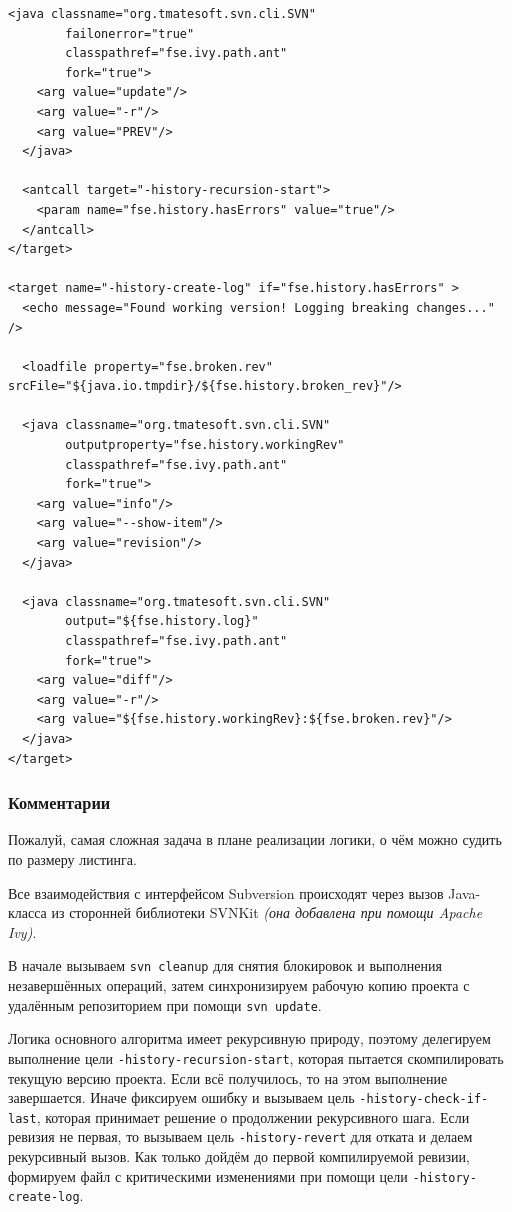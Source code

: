 \begin{lstlisting}[caption={Часть содержимого файла \texttt{build.xml}},captionpos=b]
  <java classname="org.tmatesoft.svn.cli.SVN"
        failonerror="true"
        classpathref="fse.ivy.path.ant"
        fork="true">
    <arg value="update"/>
    <arg value="-r"/>
    <arg value="PREV"/>
  </java>

  <antcall target="-history-recursion-start">
    <param name="fse.history.hasErrors" value="true"/>
  </antcall>
</target>

<target name="-history-create-log" if="fse.history.hasErrors" >
  <echo message="Found working version! Logging breaking changes..." />

  <loadfile property="fse.broken.rev" srcFile="${java.io.tmpdir}/${fse.history.broken_rev}"/>

  <java classname="org.tmatesoft.svn.cli.SVN" 
        outputproperty="fse.history.workingRev"
        classpathref="fse.ivy.path.ant"
        fork="true">
    <arg value="info"/>
    <arg value="--show-item"/>
    <arg value="revision"/>
  </java>

  <java classname="org.tmatesoft.svn.cli.SVN" 
        output="${fse.history.log}"
        classpathref="fse.ivy.path.ant"
        fork="true">
    <arg value="diff"/>
    <arg value="-r"/>
    <arg value="${fse.history.workingRev}:${fse.broken.rev}"/>
  </java>
</target>
\end{lstlisting}

\subsubsection{Комментарии}

Пожалуй, самая сложная задача в плане реализации логики, о чём можно судить по размеру листинга.

Все взаимодействия с интерфейсом Subversion происходят через вызов Java-класса из сторонней библиотеки SVNKit \textit{(она добавлена при помощи Apache Ivy)}.

В начале вызываем \texttt{svn cleanup} для снятия блокировок и выполнения незавершённых операций, затем синхронизируем рабочую копию проекта с удалённым репозиторием при помощи \texttt{svn update}.

Логика основного алгоритма имеет рекурсивную природу, поэтому делегируем выполнение цели \texttt{-history-recursion-start}, которая пытается скомпилировать текущую версию проекта. Если всё получилось, то на этом выполнение завершается. Иначе фиксируем ошибку и вызываем цель \texttt{-history-check-if-last}, которая принимает решение о продолжении рекурсивного шага. Если ревизия не первая, то вызываем цель \texttt{-history-revert} для отката и делаем рекурсивный вызов. Как только дойдём до первой компилируемой ревизии, формируем файл с критическими изменениями при помощи цели \texttt{-history-create-log}. 

